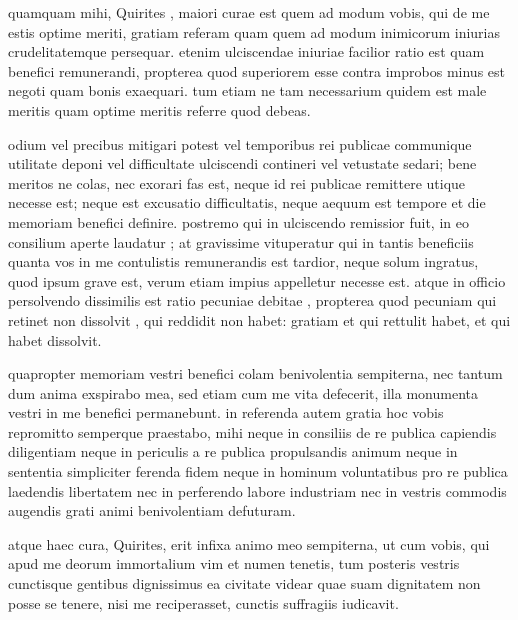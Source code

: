  quamquam mihi, Quirites , maiori curae est quem ad modum vobis, qui de me estis optime meriti, gratiam referam quam quem ad modum inimicorum iniurias crudelitatemque persequar. etenim ulciscendae iniuriae facilior ratio est quam benefici remunerandi, propterea quod superiorem esse contra improbos minus est negoti quam bonis exaequari. tum etiam ne tam necessarium quidem est male meritis quam optime meritis referre quod debeas.

 odium vel precibus mitigari potest vel temporibus rei publicae communique utilitate deponi vel difficultate ulciscendi contineri vel vetustate sedari; bene meritos ne colas, nec exorari fas est, neque id rei publicae remittere utique necesse est; neque est excusatio difficultatis, neque aequum est tempore et die memoriam benefici definire. postremo qui in ulciscendo remissior fuit, in eo consilium aperte laudatur ; at gravissime vituperatur qui in tantis beneficiis quanta vos in me contulistis remunerandis est tardior, neque solum ingratus, quod ipsum grave est, verum etiam impius appelletur necesse est. atque in officio persolvendo dissimilis est ratio pecuniae debitae , propterea quod pecuniam qui retinet non dissolvit , qui reddidit non habet: gratiam et qui rettulit habet, et qui habet dissolvit.

 quapropter memoriam vestri benefici colam benivolentia sempiterna, nec tantum dum anima exspirabo mea, sed etiam cum me vita defecerit, illa monumenta vestri in me benefici permanebunt. in referenda autem gratia hoc vobis repromitto semperque praestabo, mihi neque in consiliis de re publica capiendis diligentiam neque in periculis a re publica propulsandis animum neque in sententia simpliciter ferenda fidem neque in hominum voluntatibus pro re publica laedendis libertatem nec in perferendo labore industriam nec in vestris commodis augendis grati animi benivolentiam defuturam.

 atque haec cura, Quirites, erit infixa animo meo sempiterna, ut cum vobis, qui apud me deorum immortalium vim et numen tenetis, tum posteris vestris cunctisque gentibus dignissimus ea civitate videar quae suam dignitatem non posse se tenere, nisi me reciperasset, cunctis suffragiis iudicavit.
